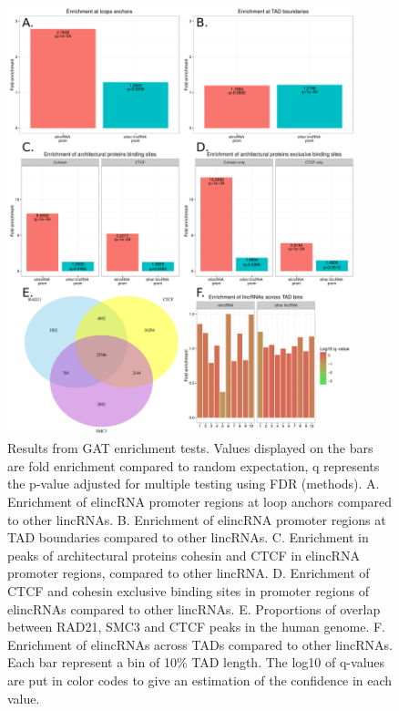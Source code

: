 \documentclass[11pt,a4paper]{report}
\begin{document}
\begin{figure}[ht]
	\includegraphics[width=0.9\textwidth]{Figures/2_Enrichment.pdf}
	\caption{Results from GAT enrichment tests. Values displayed on the bars are fold enrichment compared to random expectation, q represents the p-value adjusted for multiple testing using FDR (methods). A. Enrichment of elincRNA promoter regions at loop anchors compared to other lincRNAs. B. Enrichment of elincRNA promoter regions at TAD boundaries compared to other lincRNAs. C. Enrichment in peaks of architectural proteins cohesin and CTCF in elincRNA promoter regions, compared to other lincRNA. D. Enrichment of CTCF and cohesin exclusive binding sites in promoter regions of elincRNAs compared to other lincRNAs. E. Proportions of overlap between RAD21, SMC3 and CTCF peaks in the human genome. F. Enrichment of elincRNAs across TADs compared to other lincRNAs. Each bar represent a bin of 10\% TAD length. The log10 of q-values are put in color codes to give an estimation of the confidence in each value.}
	\label{enrich_elinc}
\end{figure}
\end{document}
